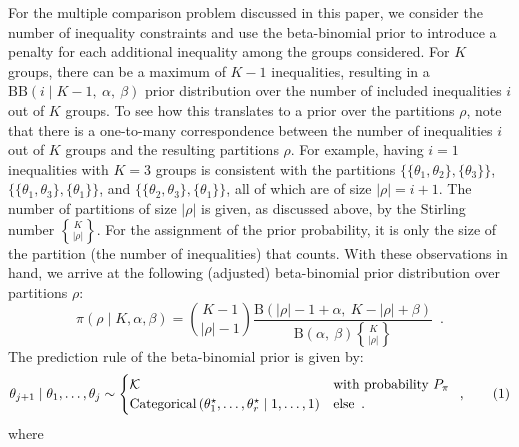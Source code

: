 \documentclass[11pt,a4paper]{article}
\theoremstyle{definition} %
\theoremstyle{case}
\newcommand{\FBeta}[2]{\text{B}\left({#1},\ {#2}\right)}
\newcommand{\BetaBinom}[4]{\text{BB}\left(#1 \mid #2 ,\ #3 ,\ #4 \right)}
\DeclareRobustCommand{\stirling}{\genfrac\{\}{0pt}{}}
\newcommand{\len}{r} %
\newcommand{\numberthis}{\addtocounter{equation}{1}\tag{\theequation}}
\begin{document}
For the multiple comparison problem discussed in this paper, we consider the number of inequality constraints and use the beta-binomial prior to introduce a penalty for each additional inequality among the groups considered. For $K$ groups, there can be a maximum of $K - 1$ inequalities, resulting in a $\BetaBinom{i}{K-1}{\alpha}{\beta}$ prior distribution over the number of included inequalities $i$ out of $K$ groups. To see how this translates to a prior over the partitions $\rho$, note that there is a one-to-many correspondence between the number of inequalities $i$ out of $K$ groups and the resulting partitions $\rho$. For example, having $i = 1$ inequalities with $K = 3$ groups is consistent with the partitions $\{\{\theta_1, \theta_2\}, \{\theta_3\}\}$, $\{\{\theta_1, \theta_3\}, \{\theta_1\}\}$, and $\{\{\theta_2, \theta_3\}, \{\theta_1\}\}$, all of which are of size $|\rho| = i + 1$. The number of partitions of size $|\rho|$ is given, as discussed above, by the Stirling number $\stirling{K}{|\rho|}$. For the assignment of the prior probability, it is only the size of the partition (the number of inequalities) that counts. With these observations in hand, we arrive at the following (adjusted) beta-binomial prior distribution over partitions $\rho$:
\begin{equation}
    \pi(\rho \mid K, \alpha, \beta) = \binom{K - 1}{|\rho| - 1}
    \frac{\FBeta{|\rho| - 1 + \alpha}{K - |\rho| + \beta}}
    {\FBeta{\alpha}{\beta}\stirling{K}{|\rho|}} \enspace .
\end{equation}
The prediction rule of the beta-binomial prior is given by:
\begin{equation}
    \theta_{j + 1} \mid \theta_1, \ldots, \theta_j \sim \begin{cases}
    \mathcal{K} & \text{with probability } P_{\pi} \\
    \text{Categorical}\left(\theta_1^{\star}, \ldots, \theta_\len^{\star} \mid 1, \ldots, 1\right) & \text{else} \enspace .
    \end{cases} \enspace , \numberthis
\end{equation}
where
\end{document}
